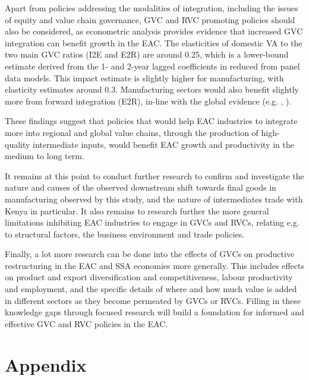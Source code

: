 \documentclass[a4paper]{article}
\begin{document}
Apart from policies addressing the modalities of integration, including the issues of equity and value chain governance, GVC and RVC promoting policies should also be considered, as econometric analysis provides evidence that increased GVC integration can benefit growth in the EAC. The elasticities of domestic VA to the two main GVC ratios  (I2E and E2R) are around 0.25, which is a lower-bound estimate derived from the 1- and 2-year lagged coefficients in reduced from panel data models.  This impact estimate is slightly higher for manufacturing, with elasticity estimates around 0.3. Manufacturing sectors would also benefit slightly more from forward integration (E2R), in-line with the global evidence (e.g.  \citet{Kummritz20161}, \citet{kummritz2015global}). \newline

These findings suggest that policies that would help EAC industries to integrate more into regional and global value chains, through the production of high-quality intermediate inputs, would benefit EAC growth and productivity in the medium to long term. \newline 

It remains at this point to conduct further research to confirm and investigate the nature and causes of the observed downstream shift towards final goods in manufacturing observed by this study, and the nature of intermediates trade with Kenya in particular. It also remains to research further the more general limitations inhibiting EAC industries to engage in GVCs and RVCs, relating e.g. to structural factors, the business environment and trade policies. \newline

Finally, a lot more research can be done into the effects of GVCs on productive restructuring in the EAC and SSA economies more generally. This includes effects on product and export diversification and competitiveness, labour productivity and employment, and the specific details of where and how much value is added in different sectors as they become permeated by GVCs or RVCs. Filling in these knowledge gaps through focused research will build a foundation for informed and effective GVC and RVC policies in the EAC. 



\newpage




\newpage
\section*{Appendix}
\end{document}
